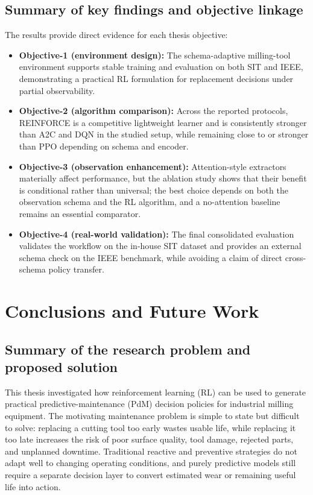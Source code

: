\documentclass[12pt,oneside]{book}
\begin{document}
\section{Summary of key findings and objective linkage}\label{sec:results-objectives}
The results provide direct evidence for each thesis objective:
\begin{itemize}
\item \textbf{Objective-1 (environment design):} The schema-adaptive milling-tool environment supports stable training and evaluation on both SIT and IEEE, demonstrating a practical RL formulation for replacement decisions under partial observability.
\item \textbf{Objective-2 (algorithm comparison):} Across the reported protocols, \textsc{REINFORCE} is a competitive lightweight learner and is consistently stronger than \textsc{A2C} and \textsc{DQN} in the studied setup, while remaining close to or stronger than PPO depending on schema and encoder.
\item \textbf{Objective-3 (observation enhancement):} Attention-style extractors materially affect performance, but the ablation study shows that their benefit is conditional rather than universal; the best choice depends on both the observation schema and the RL algorithm, and a no-attention baseline remains an essential comparator.
\item \textbf{Objective-4 (real-world validation):} The final consolidated evaluation validates the workflow on the in-house SIT dataset and provides an external schema check on the IEEE benchmark, while avoiding a claim of direct cross-schema policy transfer.
\end{itemize}


\chapter{Conclusions and Future Work}\label{ch:conclusion}

\section{Summary of the research problem and proposed solution}
This thesis investigated how reinforcement learning (RL) can be used to generate practical predictive-maintenance (PdM) decision policies for industrial milling equipment. The motivating maintenance problem is simple to state but difficult to solve: replacing a cutting tool too early wastes usable life, while replacing it too late increases the risk of poor surface quality, tool damage, rejected parts, and unplanned downtime. Traditional reactive and preventive strategies do not adapt well to changing operating conditions, and purely predictive models still require a separate decision layer to convert estimated wear or remaining useful life into action.
\end{document}
